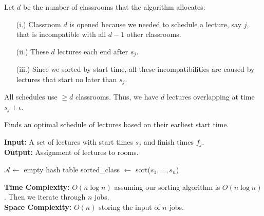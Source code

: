 \begin{Proof}
    Let $d$ be the number of classrooms that the algorithm allocates:

    \begin{enumerate}
        \item [(i.)] Classroom $d$ is opened because we needed to schedule a lecture, say $j$, that is incompatible with all $d - 1$ other classrooms.
        \item [(ii.)] These $d$ lectures each end after $s_j$.
        \item [(iii.)] Since we sorted by start time, all these incompatibilities are caused by lectures that start no later than $s_j$.
    \end{enumerate}
    \noindent
    All schedules use $\geq d$ classrooms. Thus, we have $d$ lectures overlapping at time $s_j + \epsilon$.

    \end{Proof}


    \newpage
    \begin{Func}[EarliestStartTimeFirst Algorithm - \texttt{EST($j = 1 \dots n : s_j, f_j$)}]
        Finds an optimal schedule of lectures based on their earliest start time.
        
        \vspace{.5em}
        \noindent
        \textbf{Input:} A set of lectures with start times $s_j$ and finish times $f_j$.\\
        \textbf{Output:} Assignment of lectures to rooms.\\
        \begin{algorithm}[H]
            \SetAlgoLined
            $\mathcal{A} \gets$ empty hash table 
            sorted\_class $\gets$ sort($s_1, \dots, s_n$) 
            
        \end{algorithm}

        \noindent
        \textbf{Time Complexity:} $O(n\log n)$ assuming our sorting algorithm is $O(n\log n)$. Then we iterate through $n$ jobs.\\
        \textbf{Space Complexity:} $O(n)$ storing the input of $n$ jobs.
    \end{Func}

    
    
    
